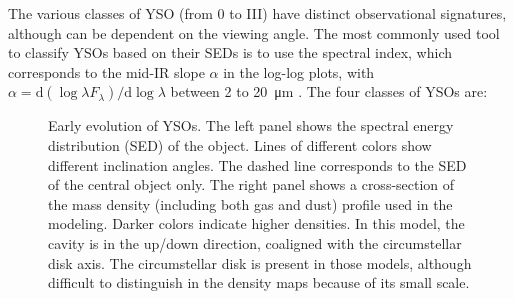 The various classes of YSO (from 0 to III) have distinct observational signatures, although can be dependent on the viewing angle. The most commonly used tool to classify YSOs based on their SEDs is to use the spectral index, which corresponds to the mid-IR slope $\alpha$ in the log-log plots, with $\alpha = \textrm{d}(\log\lambda F_\lambda)/\textrm{d}\log\lambda$ between 2 to \SI{20}{\micro\meter} \citep{McKee:2007bd}. The four classes of YSOs are:


\begin{figure}[!h]
\begin{center}
 \par\medskip
{} 
\caption[Early evolution of YSOs]{Early evolution of YSOs. The left panel shows the spectral energy distribution (SED) of the object. Lines of different colors show different inclination angles. The dashed line corresponds to the SED of the central object only. The right panel shows a cross-section of the mass density (including both gas and dust) profile used in the modeling. Darker colors indicate higher densities. In this model, the cavity is in the up/down direction, coaligned with the circumstellar disk axis. The circumstellar disk is present in those models, although difficult to distinguish in the density maps because of its small scale.}
\label{fig:EarlyStages}
\end{center}
\end{figure}

